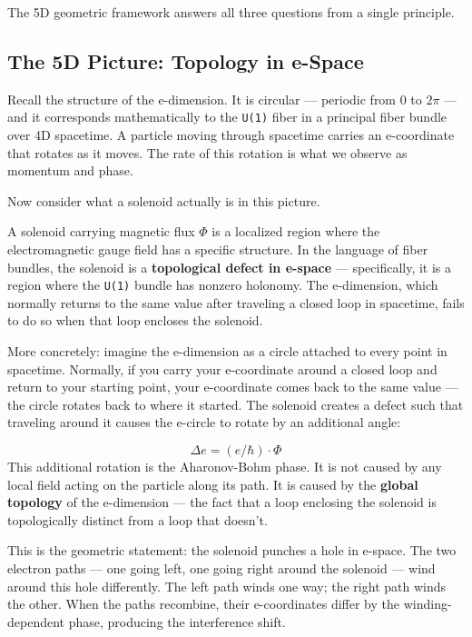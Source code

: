 \documentclass[aps,prd,preprint,superscriptaddress,longbibliography,floatfix]{revtex4-2}
\theoremstyle{remark}
\begin{document}
The 5D geometric framework answers all three questions from a single principle.



\subsection{The 5D Picture: Topology in e-Space}

Recall the structure of the e-dimension. It is circular --- periodic from 0 to $2\pi$ --- and it corresponds mathematically to the \texttt{U(1)} fiber in a principal fiber bundle over 4D spacetime. A particle moving through spacetime carries an e-coordinate that rotates as it moves. The rate of this rotation is what we observe as momentum and phase.

Now consider what a solenoid actually is in this picture.

A solenoid carrying magnetic flux $\Phi$ is a localized region where the electromagnetic gauge field has a specific structure. In the language of fiber bundles, the solenoid is a \textbf{topological defect in e-space} --- specifically, it is a region where the \texttt{U(1)} bundle has nonzero holonomy. The e-dimension, which normally returns to the same value after traveling a closed loop in spacetime, fails to do so when that loop encloses the solenoid.

More concretely: imagine the e-dimension as a circle attached to every point in spacetime. Normally, if you carry your e-coordinate around a closed loop and return to your starting point, your e-coordinate comes back to the same value --- the circle rotates back to where it started. The solenoid creates a defect such that traveling around it causes the e-circle to rotate by an additional angle:


\begin{equation}
    \Delta e = (e/\hbar) \cdot \Phi
\end{equation}
This additional rotation is the Aharonov-Bohm phase. It is not caused by any local field acting on the particle along its path. It is caused by the \textbf{global topology} of the e-dimension --- the fact that a loop enclosing the solenoid is topologically distinct from a loop that doesn't.

This is the geometric statement: the solenoid punches a hole in e-space. The two electron paths --- one going left, one going right around the solenoid --- wind around this hole differently. The left path winds one way; the right path winds the other. When the paths recombine, their e-coordinates differ by the winding-dependent phase, producing the interference shift.
\end{document}
